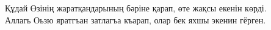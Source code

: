 \documentclass[a4paper,11pt,twocolumn]{article}
\begin{document}

\begin{table}



\centering

Құдай Өзінің жаратқандарының бәріне қарап, өте жақсы екенін көрді. \\
Аллагь Оьзю яратгъан затлагъа къарап, олар бек яхшы экенин гёрген. \\

~\\


\end{table}
\end{document}
